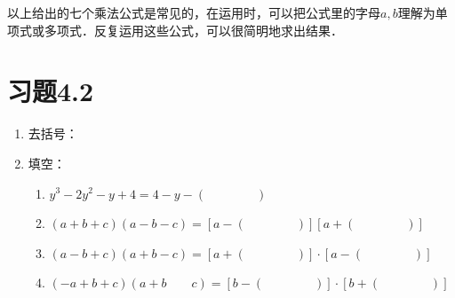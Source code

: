 以上给出的七个乘法公式是常见的，在运用时，可以把公式里的字母$a,b$理解为单项式或多项式．反复运用这些公式，可以很简明地求出结果．

\section*{习题4.2}


\begin{enumerate}
\item  去括号：

\begin{enumerate}
\end{enumerate}

\item 填空：
\begin{enumerate}
    \item $y^{3}-2 y^{2}-y+4=4-y-(\qquad\qquad)$
    \item $(a+b+c)(a-b-c)=[a-(\qquad\qquad)][a+(\qquad\qquad)]$
    \item $(a-b+c)(a+b-c)=[a+(\qquad\qquad )]\cdot [a-(\qquad\qquad)]$
    \item $(-a+b+c)(a+b \qquad c)=[b-(\qquad\qquad)] \cdot[b+(\qquad\qquad)]$
 
\end{enumerate}


\end{enumerate}
